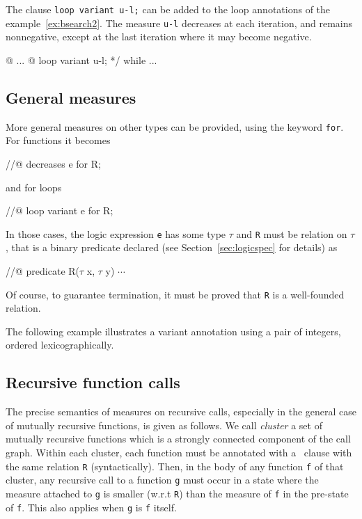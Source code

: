 \begin{example}
  The clause \lstinline|loop variant u-l;| can be added to the loop 
  annotations of the example~\ref{ex:bsearch2}.
  The measure \lstinline|u-l| decreases
  at each iteration, and remains nonnegative, except at the last
  iteration where it may become negative.
\begin{listing}{16}
  @ ...
  @ loop variant u-l; */
while ...
\end{listing}
\end{example}

\subsection{General measures}
\label{sec:generalmeasures}

More general measures on other types can be provided, using the
keyword \lstinline|for|. For functions it becomes
\begin{listing-nonumber}
//@ decreases e for R;
\end{listing-nonumber}
and for loops
\begin{listing-nonumber}
//@ loop variant e for R;
\end{listing-nonumber}
In those cases, the logic expression \lstinline|e| has some type
$\tau$ and \lstinline|R|
must be relation on $\tau$, that is a binary predicate declared 
(see Section~\ref{sec:logicspec} for details) as
\begin{listing-nonumber}
//@ predicate R($\tau$ x, $\tau$ y) $\cdots$
\end{listing-nonumber}
Of course, to guarantee
termination, it must be proved that \lstinline|R| is a well-founded relation.

\begin{example}
  The following example illustrates a variant annotation
  using a pair of integers, ordered lexicographically.
\end{example}

\subsection{Recursive function calls}

The precise semantics of measures on recursive calls, especially in
the general case of mutually recursive functions, is given as follows.
We call \emph{cluster} a set of mutually recursive functions which
is a strongly connected component of the call graph.
Within each cluster, each function must be annotated with a \decreases\
clause with the same relation \lstinline|R| (syntactically). Then, in the body
of any function \lstinline|f| of that cluster, any recursive call to a function
\lstinline|g| must occur in a state where the measure attached to
\lstinline|g| is smaller
(w.r.t \lstinline|R|) than the measure of \lstinline|f| in the pre-state of \lstinline|f|. This also
applies when \lstinline|g| is \lstinline|f| itself.

